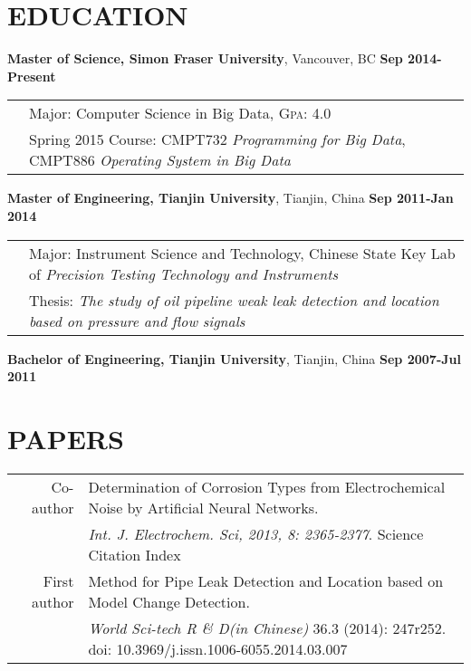 \documentclass[letterpaper,11pt]{article} %
\begin{document}
\section{EDUCATION}
\textbf{Master of Science, Simon Fraser University}, Vancouver, BC {\hfill\textbf{Sep 2014-Present}} \\
\begin{tabular}{rl}	
& Major: Computer Science in Big Data, \textsc{Gpa}: 4.0\\
 & \small{Spring 2015 Course:} CMPT732 \emph{Programming for Big Data}, CMPT886 \emph{Operating System in Big Data} \\
\end{tabular}

\textbf{Master of Engineering, Tianjin University}, Tianjin, China {\hfill\textbf{Sep 2011-Jan 2014}} \\
\begin{tabular}{rl}	
& Major: Instrument Science and Technology, \small{Chinese State Key Lab of \emph{Precision Testing Technology and Instruments}}\\
& \small{Thesis: \emph{The study of oil pipeline weak leak detection and location based on pressure and flow signals}}\\
\end{tabular}

\textbf{Bachelor of Engineering, Tianjin University}, Tianjin, China {\hfill\textbf{Sep 2007-Jul 2011}}

\section{PAPERS}
\begin{tabular}{rp{16.3cm}}
Co-author & Determination of Corrosion Types from Electrochemical Noise by Artificial Neural Networks. \\
& \small{\emph{Int. J. Electrochem. Sci, 2013, 8: 2365-2377}.}   {\hfill \small{Science Citation Index}}\\
First author &  Method for Pipe Leak Detection and Location based on Model Change Detection. \\
& \small{\emph{World Sci-tech R \& D(in Chinese)} 36.3 (2014): 247r252.} {\hfill \small{doi: 10.3969/j.issn.1006-6055.2014.03.007}}\\
\end{tabular}
\end{document}
